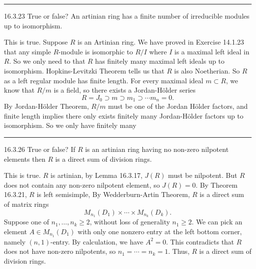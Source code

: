 \documentclass[a4paper, 12pt]{article}
\begin{document}
\noindent\rule{7in}{2.8pt}
\begin{problem}{16.3.23}
True or false? An artinian ring has a finite number of irreducible modules up to isomorphism.
\end{problem}
\begin{solution}
This is true. Suppose \(R\) is an Artinian ring. We have proved in Exercise 14.1.23 that any simple \(R\)-module is isomorphic to \(R/I\) where \(I\) is a maximal left ideal in \(R\). So we only need to that 
\(R\) has finitely many maximal left ideals up to isomorphism. Hopkins-Levitzki Theorem tells us that \(R\) is also Noetherian. So \(R\) as a left regular module has finite length. 
For every maximal ideal \(m\subset R\), we know that \(R/m\) is a field, so there exists a Jordan-H\"{o}lder series 
\[R=J_0\supset m\supset m_1\supset \cdots m_n=0.\]
By Jordan-H\"{o}lder Theorem, \(R/m\) must be one of the Jordan H\"{o}lder factors, and finite length implies there only exists finitely many Jordan-H\"{o}lder factors up to isomorphism. So we only have finitely many

\end{solution}

\noindent\rule{7in}{2.8pt}
\begin{problem}{16.3.26}
True or false? If \(R\) is an artinian ring having no non-zero nilpotent elements then \(R\) is a direct sum of division rings.
\end{problem}
\begin{solution}
This is true. \(R\) is artinian, by Lemma 16.3.17, \(J(R)\) must be nilpotent. But \(R\) does not contain any non-zero nilpotent element, so \(J(R)=0\). By Theorem 16.3.21, \(R\) is left semisimple, By Wedderburn-Artin Theorem, 
\(R\) is a direct sum of matrix rings 
\[M_{n_1}(D_1)\times \cdots \times M_{n_k}(D_k).\]
Suppose one of \(n_1,\ldots,n_k\geq 2\), without loss of generality \(n_1\geq 2\). We can pick an element \(A\in M_{n_1}(D_1)\) with only one nonzero entry at the left bottom corner, namely \((n,1)\)-entry. By calculation, we have \(A^2=0\). This contradicts that 
\(R\) does not have non-zero nilpotents, so \(n_1=\cdots=n_k=1\). Thus, \(R\) is a direct sum of division rings. 
\end{solution}
\end{document}

